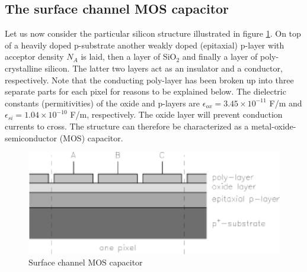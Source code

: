 \subsection{The surface channel MOS capacitor}

Let us now consider the particular silicon structure illustrated in
figure \ref{CCD.figpMOS}. On top of a heavily doped p-substrate
another weakly doped (epitaxial) p-layer with acceptor density $N_A$
is laid, then a layer of SiO$_2$ and finally a layer of
poly-crystalline silicon. The latter two layers act as an insulator and
a conductor, respectively. Note that the conducting poly-layer has
been broken up into three separate parts for each pixel for reasons to
be explained below. The dielectric constants (permitivities) of the
oxide and p-layers are $\epsilon_{ox} = 3.45 \times 10^{-11}$ F/m and
$\epsilon_{si} = 1.04\times 10^{-10}$ F/m, respectively.  The oxide
layer will prevent conduction currents to cross. The structure can
therefore be characterized as a metal-oxide-semiconductor (MOS)
capacitor.

\begin{figure}[h]
  \centering
	\includegraphics{CCD_pMOS.eps}
  \caption{Surface channel MOS capacitor}
  \label{CCD.figpMOS}
\end{figure}

